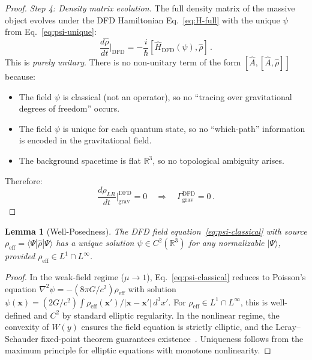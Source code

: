 \documentclass[aps,prl,twocolumn,superscriptaddress,nofootinbib,longbibliography]{revtex4-2}
\newtheorem{lemma}{Lemma}
\begin{document}
\begin{proof}
\emph{Step 4: Density matrix evolution.}
The full density matrix of the massive object evolves under the DFD
Hamiltonian Eq.~\eqref{eq:H-full} with the unique $\psi$ from
Eq.~\eqref{eq:psi-unique}:
\begin{equation}\label{eq:rho-DFD}
\frac{d\hat{\rho}}{dt}\bigg|_{\text{DFD}} =
-\frac{i}{\hbar}[\hat{H}_{\text{DFD}}(\psi), \hat{\rho}]\,.
\end{equation}
This is \emph{purely unitary}. There is no non-unitary term of the form
$[\hat{A}, [\hat{A}, \hat{\rho}]]$ because:
\begin{itemize}
\item[(a)] The field $\psi$ is classical (not an operator), so no
``tracing over gravitational degrees of freedom'' occurs.
\item[(b)] The field $\psi$ is unique for each quantum state, so no
``which-path'' information is encoded in the gravitational field.
\item[(c)] The background spacetime is flat $\mathbb{R}^3$, so no
topological ambiguity arises.
\end{itemize}

Therefore:
\begin{equation}
\boxed{
\frac{d\rho_{LR}}{dt}\bigg|_{\text{grav}}^{\text{DFD}} = 0
\quad \Longrightarrow \quad
\Gamma_{\text{grav}}^{\text{DFD}} = 0\,.
}
\end{equation}
\end{proof}

\begin{lemma}[Well-Posedness]
\label{lem:wellposed}
The DFD field equation~\eqref{eq:psi-classical} with source
$\rho_{\text{eff}} = \langle\Psi|\hat{\rho}|\Psi\rangle$ has a unique
solution $\psi \in C^2(\mathbb{R}^3)$ for any normalizable
$|\Psi\rangle$, provided $\rho_{\text{eff}} \in L^1 \cap L^\infty$.
\end{lemma}

\begin{proof}
In the weak-field regime ($\mu \to 1$), Eq.~\eqref{eq:psi-classical}
reduces to Poisson's equation $\nabla^2\psi = -(8\pi G/c^2)\rho_{\text{eff}}$
with solution
$\psi(\mathbf{x}) = (2G/c^2)\int\rho_{\text{eff}}(\mathbf{x}')
/|\mathbf{x}-\mathbf{x}'|\,d^3x'$.
For $\rho_{\text{eff}} \in L^1 \cap L^\infty$, this is well-defined and
$C^2$ by standard elliptic regularity. In the nonlinear regime, the
convexity of $W(y)$ ensures the field equation is strictly elliptic,
and the Leray--Schauder fixed-point theorem guarantees
existence~\cite{Alcock2025DFD}. Uniqueness follows from the maximum
principle for elliptic equations with monotone nonlinearity.
\end{proof}
\end{document}
